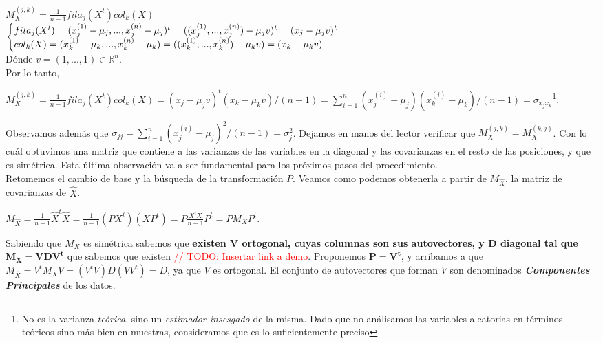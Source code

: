 $M_{X}^{(j,k)} = \frac{1}{n - 1}fila_{j}(X^t)col_{k}(X)$ \\

$\Bigg\{
\begin{array}{@{}ll@{}}
	fila_{j}(X^t) = (x^{(1)}_{j} - \mu_{j}, ..., x^{(n)}_{j} - \mu_{j})^t = ((x^{(1)}_{j}, ..., x^{(n)}_{j}) - \mu_{j}v)^{t} = (x_{j} - \mu_{j}v)^{t} \\
	col_{k}(X) = (x^{(1)}_{k} - \mu_{k}, ..., x^{(n)}_{k} - \mu_{k}) = ((x^{(1)}_{k}, ..., x^{(n)}_{k}) - \mu_{k}v) = (x_{k} - \mu_{k}v)
\end{array}$ \\

D\'onde $v = (1, ..., 1) \in \mathbb{R}^{n}$. \\

Por lo tanto,

$M_{X}^{(j,k)} = \frac{1}{n - 1}fila_{j}(X^t)col_{k}(X) = (x_{j} - \mu_{j}v)^{t}(x_{k} - \mu_{k}v) / (n - 1) = \sum\limits_{i = 1}^{n}(x^{(i)}_{j} - \mu_{j})(x^{(i)}_{k} - \mu_{k}) / (n - 1) = \sigma_{x_{j}x_{k}}$\footnote{No es la varianza \textit{te\'orica}, sino un \textit{estimador insesgado} de la misma. Dado que no an\'alisamos las variables aleatorias en t\'erminos te\'oricos sino m\'as bien en muestras, consideramos que es lo suficientemente preciso}.

Observamos adem\'as que $\sigma_{jj} = \sum\limits_{i = 1}^{n}(x_{j}^{(i)} - \mu_{j})^{2} / (n - 1) = \sigma_{j}^{2}$. Dejamos en manos del lector verificar que $M_{X}^{(j,k)} = M_{X}^{(k,j)}$. Con lo cu\'al obtuvimos una matriz que contiene a las varianzas de las variables en la diagonal y las covarianzas en el resto de las posiciones, y que es sim\'etrica. Esta \'ultima observaci\'on va a ser fundamental para los pr\'oximos pasos del procedimiento. \\

Retomemos el cambio de base y la b\'usqueda de la transformaci\'on $P$. Veamos como podemos obtenerla a partir de $M_{\hat{X}}$, la matriz de covarianzas de $\hat{X}$.

$M_{\hat{X}} = \frac{1}{n - 1}\hat{X}^{t}\hat{X} = \frac{1}{n - 1}(PX^{t})(XP^{t}) = P\frac{X^{t}X}{n - 1}P^{t} = PM_{X}P^{t}$.

Sabiendo que $M_{X}$ es sim\'etrica sabemos que \textbf{existen $\mathbf{V}$ ortogonal, cuyas columnas son sus autovectores, y $\mathbf{D}$ diagonal tal que $\mathbf{M_{X} = VDV^{t}}$} que sabemos que existen \textcolor{red}{// TODO: Insertar link a demo}. Proponemos $\mathbf{P = V^{t}}$, y arribamos a que $M_{\hat{X}} = V^{t}M_{X}V = (V^{t}V)D(VV^{t}) = D$, ya que $V$ es ortogonal. El conjunto de autovectores que forman $V$ son denominados \textbf{\textit{Componentes Principales}} de los datos.

